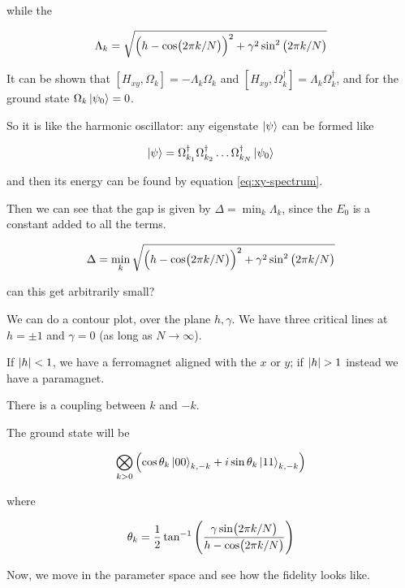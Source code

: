 \documentclass[main.tex]{subfiles}
\begin{document}
while the

\begin{equation}
    \Lambda_k = \sqrt{\qty(h - \cos(2 \pi k /N))^2 + \gamma^2 \sin^2\qty(2 \pi k /N) }
\end{equation}

It can be shown that \([H _{xy}, \Omega_k ] = - \Lambda_k \Omega_k\) and  \([H _{xy}, \Omega_k^\dag ] = \Lambda_k \Omega_k ^\dag\), and for the ground state \(\Omega_k \ket{\psi_0} = 0 \).

So it is like the harmonic oscillator: any eigenstate \(\ket{\psi } \) can be formed like

\begin{equation}
    \ket{\psi} = \Omega_{k_1}^\dag \Omega_{k_2}^\dag \dots \Omega_{k_N}^\dag \ket{\psi_0}
\end{equation}

and then its energy can be found by equation \eqref{eq:xy-spectrum}.

Then we can see that the gap is given by \(\Delta = \min_k \Lambda_k\), since the \(E_0\) is a constant added to all the terms.

\begin{equation}
    \Delta = \min_k \sqrt{\qty(h - \cos(2 \pi k /N))^2 + \gamma^2 \sin^2\qty(2 \pi k /N) }
\end{equation}

can this get arbitrarily small?

We can do a contour plot, over the plane \(h, \gamma\). We have three critical lines at \(h = \pm 1\) and \(\gamma = 0\) (as long as \(N \rightarrow \infty\)).

If \(\abs{h} <1\), we have a ferromagnet aligned with the \(x\) or \(y\); if \(\abs{h}>1\) instead we have a paramagnet.

There is a coupling between \(k\) and \(-k\).

The ground state will be

\begin{equation}
    \bigotimes _{k>0}\qty( \cos \theta_k \ket{00}_{k, -k} + i \sin \theta_k \ket{11}_{k, -k} )
\end{equation}

where

\begin{equation}
    \theta_k = \frac{1}{2}\tan ^{-1} \qty(\frac{\gamma \sin (2 \pi k /N)}{h - \cos (2 \pi k /N)})
\end{equation}

Now, we move in the parameter space and see how the fidelity looks like.
\end{document}
